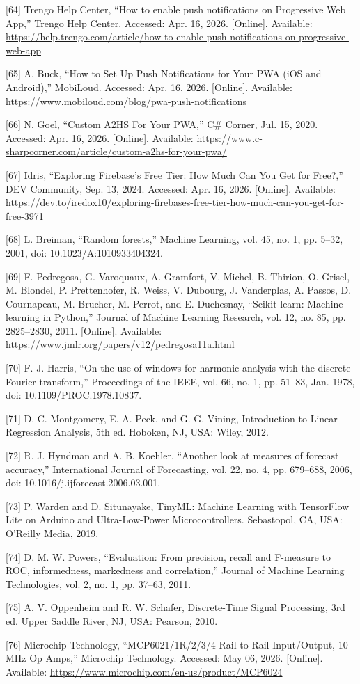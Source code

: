 \begin{thesisreferences}
{[}64{]} Trengo Help Center, ``How to enable push notifications on
Progressive Web App,'' Trengo Help Center. Accessed: Apr. 16, 2026.
{[}Online{]}. Available:
\url{https://help.trengo.com/article/how-to-enable-push-notifications-on-progressive-web-app}

{[}65{]} A. Buck, ``How to Set Up Push Notifications for Your PWA (iOS
and Android),'' MobiLoud. Accessed: Apr. 16, 2026. {[}Online{]}.
Available:
\url{https://www.mobiloud.com/blog/pwa-push-notifications}

{[}66{]} N. Goel, ``Custom A2HS For Your PWA,'' C\# Corner, Jul. 15,
2020. Accessed: Apr. 16, 2026. {[}Online{]}. Available:
\url{https://www.c-sharpcorner.com/article/custom-a2hs-for-your-pwa/}

{[}67{]} Idris, ``Exploring Firebase's Free Tier: How Much Can You Get
for Free?,'' DEV Community, Sep. 13, 2024. Accessed: Apr. 16, 2026.
{[}Online{]}. Available:
\url{https://dev.to/iredox10/exploring-firebases-free-tier-how-much-can-you-get-for-free-3971}

{[}68{]} L. Breiman, ``Random forests,'' Machine Learning, vol. 45, no.
1, pp. 5--32, 2001, doi: 10.1023/A:1010933404324.

{[}69{]} F. Pedregosa, G. Varoquaux, A. Gramfort, V. Michel, B. Thirion,
O. Grisel, M. Blondel, P. Prettenhofer, R. Weiss, V. Dubourg,
J. Vanderplas, A. Passos, D. Cournapeau, M. Brucher, M. Perrot, and
E. Duchesnay, ``Scikit-learn: Machine learning in Python,'' Journal of
Machine Learning Research, vol. 12, no. 85, pp. 2825--2830, 2011.
{[}Online{]}. Available:
\url{https://www.jmlr.org/papers/v12/pedregosa11a.html}

{[}70{]} F. J. Harris, ``On the use of windows for harmonic analysis
with the discrete Fourier transform,'' Proceedings of the IEEE, vol. 66,
no. 1, pp. 51--83, Jan. 1978, doi: 10.1109/PROC.1978.10837.

{[}71{]} D. C. Montgomery, E. A. Peck, and G. G. Vining, Introduction
to Linear Regression Analysis, 5th ed. Hoboken, NJ, USA: Wiley, 2012.

{[}72{]} R. J. Hyndman and A. B. Koehler, ``Another look at measures of
forecast accuracy,'' International Journal of Forecasting, vol. 22, no.
4, pp. 679--688, 2006, doi: 10.1016/j.ijforecast.2006.03.001.

{[}73{]} P. Warden and D. Situnayake, TinyML: Machine Learning with
TensorFlow Lite on Arduino and Ultra-Low-Power Microcontrollers.
Sebastopol, CA, USA: O'Reilly Media, 2019.

{[}74{]} D. M. W. Powers, ``Evaluation: From precision, recall and
F-measure to ROC, informedness, markedness and correlation,'' Journal of
Machine Learning Technologies, vol. 2, no. 1, pp. 37--63, 2011.

{[}75{]} A. V. Oppenheim and R. W. Schafer, Discrete-Time Signal
Processing, 3rd ed. Upper Saddle River, NJ, USA: Pearson, 2010.

{[}76{]} Microchip Technology, ``MCP6021/1R/2/3/4 Rail-to-Rail
Input/Output, 10 MHz Op Amps,'' Microchip Technology. Accessed:
May 06, 2026. {[}Online{]}. Available:
\url{https://www.microchip.com/en-us/product/MCP6024}

\end{thesisreferences}